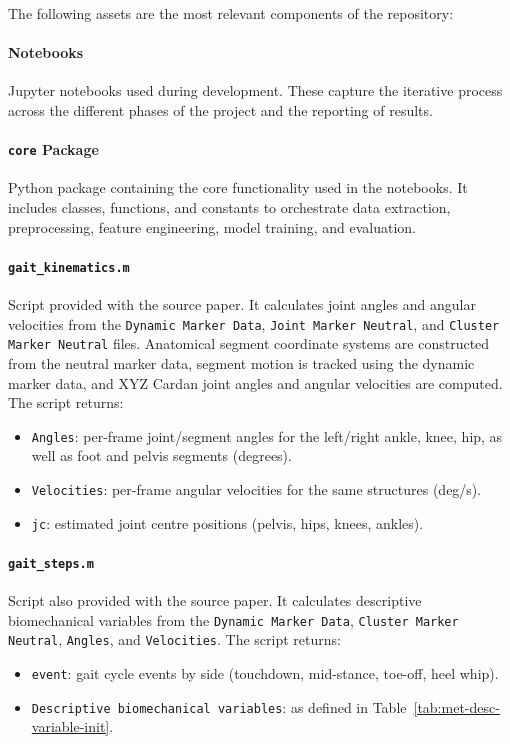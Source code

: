 {The following assets are the most relevant components of the repository:  

\paragraph{Notebooks}  
Jupyter notebooks used during development. These capture the iterative process across the different phases of the project and the reporting of results.

\paragraph{\texttt{core} Package}  
Python package containing the core functionality used in the notebooks. It includes classes, functions, and constants to orchestrate data extraction, preprocessing, feature engineering, model training, and evaluation.  

\paragraph{\texttt{gait\_kinematics.m}}  
Script provided with the source paper. It calculates joint angles and angular velocities from the \texttt{Dynamic Marker Data}, \texttt{Joint Marker Neutral}, and \texttt{Cluster Marker Neutral} files. Anatomical segment coordinate systems are constructed from the neutral marker data, segment motion is tracked using the dynamic marker data, and XYZ Cardan joint angles and angular velocities are computed. The script returns:  
\begin{itemize}
    \item \texttt{Angles}: per-frame joint/segment angles for the left/right ankle, knee, hip, as well as foot and pelvis segments (degrees).
    \item \texttt{Velocities}: per-frame angular velocities for the same structures (deg/s).
    \item \texttt{jc}: estimated joint centre positions (pelvis, hips, knees, ankles).
\end{itemize}

\paragraph{\texttt{gait\_steps.m}}  
Script also provided with the source paper. It calculates descriptive biomechanical variables from the \texttt{Dynamic Marker Data}, \texttt{Cluster Marker Neutral}, \texttt{Angles}, and \texttt{Velocities}. The script returns:  
\begin{itemize}
    \item \texttt{event}: gait cycle events by side (touchdown, mid-stance, toe-off, heel whip).
    \item \texttt{Descriptive biomechanical variables}: as defined in Table~\ref{tab:met-desc-variable-init}.
\end{itemize}

}
